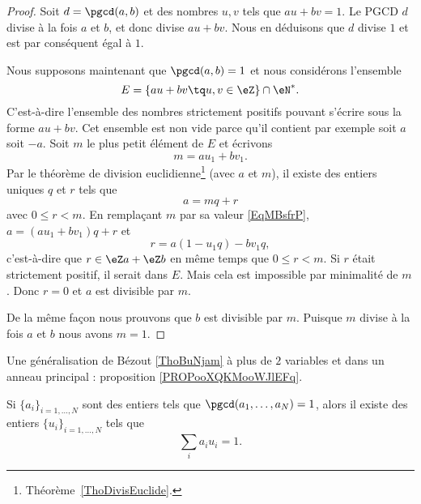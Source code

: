 \begin{proof}
	Soit \( d=\pgcd(a,b)\) et des nombres \( u,v\) tels que \( au+bv=1\). Le PGCD \( d\) divise à la fois \( a\) et \( b\), et donc divise \( au+bv\). Nous en déduisons que \( d\) divise \( 1\) et est par conséquent égal à \( 1\).

	Nous supposons maintenant que \( \pgcd(a,b)=1\) et nous considérons l'ensemble
	\begin{equation}
		E=\{ au+bv\tq u,v\in \eZ \}\cap \eN^*.
	\end{equation}
	C'est-à-dire l'ensemble des nombres strictement positifs pouvant s'écrire sous la forme \( au+bv\). Cet ensemble est non vide parce qu'il contient par exemple soit \( a\) soit \( -a\). Soit \( m\) le plus petit élément de \( E\) et écrivons
	\begin{equation}    \label{EqMBsfrP}
		m=au_1+bv_1.
	\end{equation}
	Par le théorème de division euclidienne\footnote{Théorème~\ref{ThoDivisEuclide}.} (avec \( a\) et \( m\)), il existe des entiers uniques \( q\) et \( r\) tels que
	\begin{equation}
		a=mq+r
	\end{equation}
	avec \( 0\leq r<m\). En remplaçant \( m\) par sa valeur \eqref{EqMBsfrP}, \( a=(au_1+bv_1)q+r\) et
	\begin{equation}
		r=a(1-u_1q)-bv_1q,
	\end{equation}
	c'est-à-dire que \( r\in \eZ a+\eZ b\) en même temps que \( 0\leq r<m\). Si \( r\) était strictement positif, il serait dans \( E\). Mais cela est impossible par minimalité de \( m\). Donc \( r=0\) et \( a\) est divisible par \( m\).

	De la même façon nous prouvons que \( b\) est divisible par \( m\). Puisque \( m\) divise à la fois \( a\) et \( b\) nous avons \( m=1\).
\end{proof}

Une généralisation de Bézout \ref{ThoBuNjam} à plus de \( 2\) variables et dans un anneau principal : proposition \ref{PROPooXQKMooWJlEFq}.
\begin{proposition}     \label{PROPooWSMTooMdfqse}
	Si \( \{ a_i \}_{i=1,\ldots, N}\) sont des entiers tels que \( \pgcd(a_1,\ldots, a_N)=1\), alors il existe des entiers \( \{ u_i \}_{i=1,\ldots, N}\) tels que
	\begin{equation}
		\sum_ia_iu_i=1.
	\end{equation}
\end{proposition}


